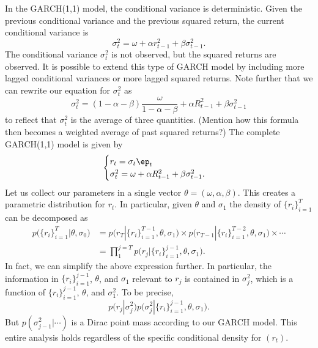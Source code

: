 \documentclass{article}
\begin{document}
In the GARCH(1,1) model, the conditional variance is deterministic.  Given the previous conditional variance and the previous squared return, the current conditional variance is
\[
\sigma_t^2 = \omega + \alpha r_{t-1}^2 + \beta \sigma_{t-1}^2.
\]
The conditional variance $\sigma^2_t$ is not observed, but the squared returns are observed.  It is possible to extend this type of GARCH model by including more lagged conditional variances or more lagged squared returns.  Note further that we can rewrite our equation for $\sigma^2_t$ as
\[
\sigma^2_t = (1 - \alpha - \beta) \frac{\omega}{1 - \alpha - \beta} + \alpha R^2_{t-1} + \beta \sigma^2_{t-1}
\]
to reflect that $\sigma^2_t$ is the average of three quantities.  (Mention how this formula then becomes a weighted average of past squared returns?)
The complete GARCH(1,1) model is given by
\[
\begin{cases}
r_t = \sigma_t \ep_t \\
\sigma^2_t = \omega + \alpha R^2_{t-1} + \beta \sigma^2_{t-1}.
\end{cases}
\]
Let us collect our parameters in a single vector $\theta = (\omega, \alpha, \beta)$.  This creates a parametric distribution for $r_t$.  In particular, given $\theta$ and $\sigma_1$ the density of $\{r_i\}_{i=1}^T$ can be decomposed as
\begin{align*}
p \Big( \{r_i\}_{i=1}^T | \theta, \sigma_0 \Big)
& = p \Big( r_T | \{r_i\}_{i=1}^{T-1}, \theta, \sigma_1 \Big) \times
p \Big( r_{T-1} | \{r_i\}_{i=1}^{T-2}, \theta, \sigma_1 \Big) \times \cdots \\
& = \prod_{1}^{j=T} p \Big( r_{j} | \{r_i\}_{i=1}^{j-1}, \theta, \sigma_1 \Big).
\end{align*}
In fact, we can simplify the above expression further.  In particular, the information in $\{r_i\}_{i=1}^{j-1}$, $\theta$, and $\sigma_1$ relevant to $r_j$ is contained in $\sigma_j^2$, which is a function of $\{r_i\}_{i=1}^{j-1}$, $\theta$, and $\sigma_1^2$.  To be precise,
\[
p \Big( r_j | \sigma_{j}^2 \Big) p \Big( \sigma_{j}^2 | \{r_i\}_{i=1}^{j-1}, \theta, \sigma_1 \Big).
\]
But $p(\sigma_{j-1}^2 | \cdots)$ is a Dirac point mass according to our GARCH model.  This entire analysis holds regardless of the specific conditional density for $(r_t)$.
\end{document}

